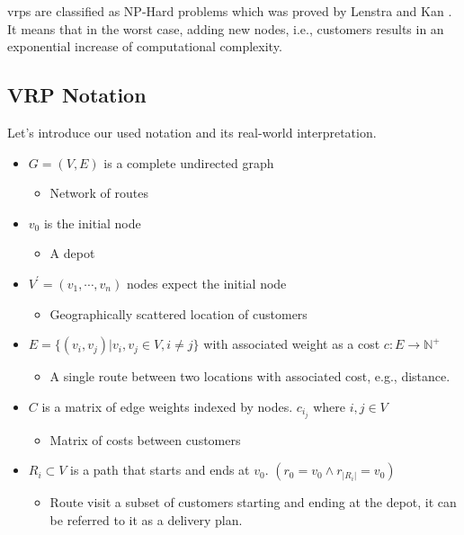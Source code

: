     \gls{vrp}s are classified as NP-Hard problems which was proved by Lenstra and Kan \cite{time-complexity-vrp}. It means that in the worst case, adding new nodes, i.e., customers results in an exponential increase of computational complexity.
    
    \subsection{VRP Notation}
    Let's introduce our used notation and its real-world interpretation.
    \begin{itemize}
        \item $G=(V,E)$ is a complete undirected graph
        \begin{itemize}
            \item Network of routes
        \end{itemize}
        \item $v_0$ is the initial node
        \begin{itemize}
            \item A depot
        \end{itemize}
        \item $V^{\prime} = (v_1, \cdots, v_n)$ nodes expect the initial node
        \begin{itemize}
            \item Geographically scattered location of customers
        \end{itemize}
        \item $E = \{(v_i, v_j)| v_i, v_j \in V, i \neq j\}$ with associated weight as a cost $c: E \to \mathbb{N}^+$
        \begin{itemize}
            \item A single route between two locations with associated cost, e.g., distance.
        \end{itemize}
        \item $C$ is a matrix of edge weights indexed by nodes. $c_i_j$ where $i,j \in V$
        \begin{itemize}
            \item Matrix of costs between customers
        \end{itemize}
        \item $R_i \subset V$ is a path that starts and ends at $v_0$. $(r_0 = v_0 \land r_{|R_i|} = v_0)$
        \begin{itemize}
            \item Route visit a subset of customers starting and ending at the depot, it can be referred to it as a delivery plan.

\end{itemize}
\end{itemize}
